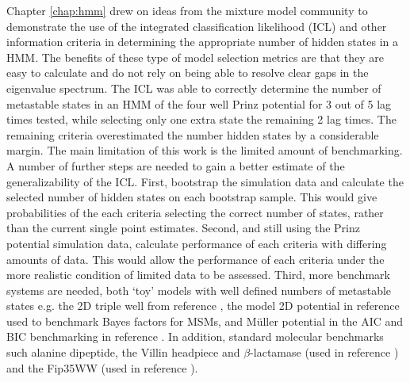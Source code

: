 Chapter \ref{chap:hmm} drew on ideas from the mixture model community to demonstrate the use of the integrated classification likelihood (ICL) and other information criteria in determining  the appropriate number of hidden states in a HMM.  The benefits of these type of model selection metrics are that they are easy to calculate and do not rely on being able to resolve clear gaps in the eigenvalue spectrum. The ICL was able to correctly determine the number of metastable states in an HMM of the four well Prinz potential for \num{3} out of \num{5} lag times tested, while selecting only one extra state the remaining \num{2} lag times. The remaining criteria overestimated the number  hidden states by a considerable margin. The main limitation of this work is the limited amount of  benchmarking. A number of further steps are needed to gain a better estimate of the generalizability of the ICL. First, bootstrap the simulation data and calculate the selected number of hidden states on each bootstrap sample. This would give probabilities of the each criteria selecting the correct number of states, rather than the current single point estimates. Second, and still using the Prinz potential simulation data, calculate performance of each criteria with differing amounts of data. This would allow the performance of each criteria under the more realistic condition of limited data to be assessed. Third, more benchmark systems are needed, both `toy' models with well defined numbers of metastable states e.g. the 2D triple well from reference \cite{noeProjectedHiddenMarkov2013a}, the model 2D potential in reference \cite{bacalladoBayesianComparisonMarkov2009a} used to benchmark Bayes factors for MSMs, and M{\"u}ller potential in the AIC and BIC benchmarking in reference \cite{mcgibbonStatisticalModelSelection2014a}. In addition, standard molecular benchmarks such alanine dipeptide, the Villin headpiece and $\beta$-lactamase (used in reference \cite{bowmanQuantitativeComparisonAlternative2013}) and the Fip35WW (used in reference \cite{mcgibbonStatisticalModelSelection2014a}).  

